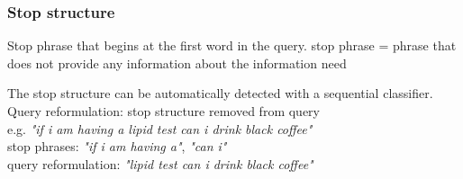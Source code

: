 \begin{frame}
\frametitle{Stop structure}
\begin{block}
{Stop phrase that begins at the first word in the query.}
stop phrase =  phrase that does not provide any information about the information need
\end{block}
\vskip10pt
The stop structure can be automatically detected with a sequential classifier.
\vskip10pt
Query reformulation: stop structure removed from query\\
\vskip10pt
e.g. \textit{"if i am having a lipid test can i drink black coffee"}\\
stop phrases: \textit{"if i am having a"}, \textit{"can i"}\\
query reformulation: \textit{"lipid test can i drink black coffee"}

\end{frame}

